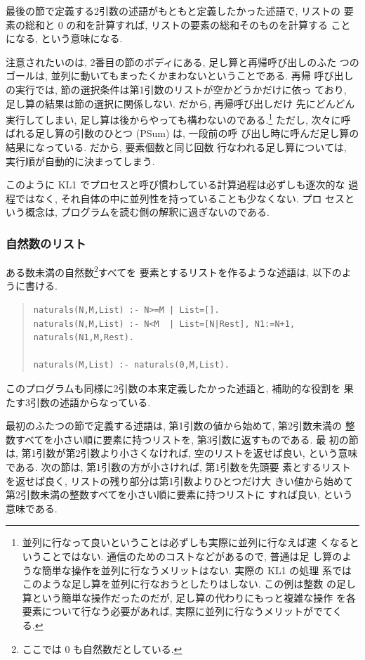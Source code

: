 \documentclass[a4,titlepage]{jsreport}
\newenvironment{program}{\begin{quote}}{\end{quote}}
\begin{document}
最後の節で定義する2引数の述語がもともと定義したかった述語で, リストの
要素の総和と 0 の和を計算すれば, リストの要素の総和そのものを計算する
ことになる, という意味になる.

注意されたいのは, 2番目の節のボディにある, 足し算と再帰呼び出しのふた
つのゴールは, 並列に動いてもまったくかまわないということである.  再帰
呼び出しの実行では, 節の選択条件は第1引数のリストが空かどうかだけに依っ
ており, 足し算の結果は節の選択に関係しない.  だから, 再帰呼び出しだけ
先にどんどん実行してしまい, 足し算は後からやっても構わないのである.\footnote
{並列に行なって良いということは必ずしも実際に並列に行なえば速
くなるということではない.  通信のためのコストなどがあるので, 普通は足
し算のような簡単な操作を並列に行なうメリットはない.  実際の KL1 の処理
系ではこのような足し算を並列に行なおうとしたりはしない.  この例は整数
の足し算という簡単な操作だったのだが, 足し算の代わりにもっと複雑な操作
を各要素について行なう必要があれば, 実際に並列に行なうメリットがでてく
る.} ただし, 次々に呼ばれる足し算の引数のひとつ (PSum) は, 一段前の呼
び出し時に呼んだ足し算の結果になっている.  だから, 要素個数と同じ回数
行なわれる足し算については, 実行順が自動的に決まってしまう.

このように KL1 でプロセスと呼び慣わしている計算過程は必ずしも逐次的な
過程ではなく, それ自体の中に並列性を持っていることも少なくない.  プロ
セスという概念は, プログラムを読む側の解釈に過ぎないのである.

\subsubsection{自然数のリスト}
ある数未満の自然数\footnote{ここでは 0 も自然数だとしている.}すべてを
要素とするリストを作るような述語は, 以下のように書ける.
\begin{program}
\begin{Verbatim}[baselinestretch=0.8]
naturals(N,M,List) :- N>=M | List=[].
naturals(N,M,List) :- N<M  | List=[N|Rest], N1:=N+1, naturals(N1,M,Rest).

naturals(M,List) :- naturals(0,M,List).
\end{Verbatim}
\end{program}
このプログラムも同様に2引数の本来定義したかった述語と, 補助的な役割を
果たす3引数の述語からなっている.

最初のふたつの節で定義する述語は, 第1引数の値から始めて, 第2引数未満の
整数すべてを小さい順に要素に持つリストを, 第3引数に返すものである. 最
初の節は, 第1引数が第2引数より小さくなければ, 空のリストを返せば良い, 
という意味である.  次の節は, 第1引数の方が小さければ, 第1引数を先頭要
素とするリストを返せば良く, リストの残り部分は第1引数よりひとつだけ大
きい値から始めて第2引数未満の整数すべてを小さい順に要素に持つリストに
すれば良い, という意味である.
\end{document}
